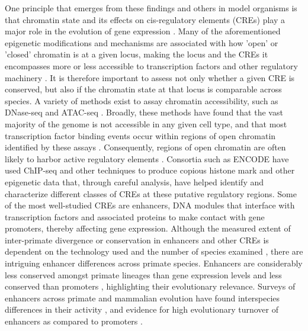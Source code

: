 One principle that emerges from these findings and others in model organisms is that chromatin state and its effects on cis-regulatory elements (CREs) play a major role in the evolution of gene expression \cite{Romero.2012, Degner.2012}. Many of the aforementioned epigenetic modifications and mechanisms are associated with how 'open' or 'closed' chromatin is at a given locus, making the locus and the CREs it encompasses more or less accessible to transcription factors and other regulatory machinery \cite{Calo.2013}. It is therefore important to assess not only whether a given CRE is conserved, but also if the chromatin state at that locus is comparable across species. A variety of methods exist to assay chromatin accessibility, such as DNase-seq and ATAC-seq \cite{Klein.2020, Tsompana.2014, Buenrostro.2015}. Broadly, these methods have found that the vast majority of the genome is not accessible in any given cell type, and that most transcription factor binding events occur within regions of open chromatin identified by these assays \cite{Thurman.2012}. Consequently, regions of open chromatin are often likely to harbor active regulatory elements \cite{Song.2011, Klemm.2019}. Consortia such as ENCODE have used ChIP-seq and other techniques to produce copious histone mark and other epigenetic data that, through careful analysis, have helped identify and characterize different classes of CREs at these putative regulatory regions\cite{Consortium.2012, Li.2018, Ernst.2012, Hoffman.2012}. Some of the most well-studied CREs are enhancers, DNA modules that interface with transcription factors and associated proteins to make contact with gene promoters, thereby affecting gene expression. Although the measured extent of inter-primate divergence or conservation in enhancers and other CREs is dependent on the technology used and the number of species examined \cite{Edsall.2019, Swain-Lenz.2019}, there are intriguing enhancer differences across primate species. Enhancers are considerably less conserved amongst primate lineages than gene expression levels \cite{Villar.2015, Berthelot.2018} and less conserved than promoters \cite{Trizzino.2017}, highlighting their evolutionary relevance. Surveys of enhancers across primate and mammalian evolution have found interspecies differences in their activity \cite{Klein.2018, Prescott.2015, Shibata.2012}, and evidence for high evolutionary turnover of enhancers as compared to promoters \cite{Carelli.2018, Villar.2015)}.

